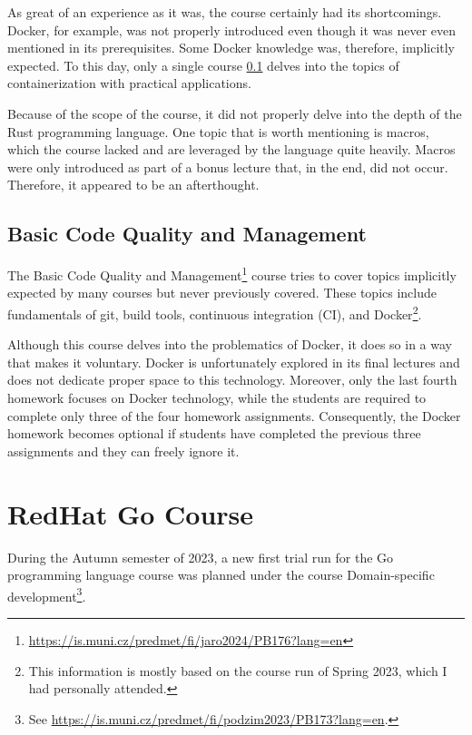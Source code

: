\documentclass[
  digital,
  color,
  oneside,
  nosansbold,
  nocolorbold,
  lof,
  lot,
]{fithesis4}
\begin{document}
As great of an experience as it was, the course certainly had its shortcomings. Docker, for example, was not properly introduced even though it was never even mentioned in its prerequisites. Some Docker knowledge was, therefore, implicitly expected. To this day, only a single course \cref{code-quality-and-management} delves into the topics of containerization with practical applications.

Because of the scope of the course, it did not properly delve into the depth of the Rust programming language. One topic that is worth mentioning is macros, which the course lacked and are leveraged by the language quite heavily. Macros were only introduced as part of a bonus lecture that, in the end, did not occur. Therefore, it appeared to be an afterthought.

\subsection{Basic Code Quality and Management}\label{code-quality-and-management}

The Basic Code Quality and Management\footnote{\url{https://is.muni.cz/predmet/fi/jaro2024/PB176?lang=en}} course tries to cover topics implicitly expected by many courses but never previously covered. These topics include fundamentals of git, build tools, continuous integration (CI), and Docker\footnote{This information is mostly based on the course run of Spring 2023, which I had personally attended.}. 

Although this course delves into the problematics of Docker, it does so in a way that makes it voluntary. Docker is unfortunately explored in its final lectures and does not dedicate proper space to this technology. Moreover, only the last fourth homework focuses on Docker technology, while the students are required to complete only three of the four homework assignments. Consequently, the Docker homework becomes optional if students have completed the previous three assignments and they can freely ignore it.

\section{RedHat Go Course}

During the Autumn semester of 2023, a new first trial run for the Go programming language course was planned under the course Domain-specific development\footnote{See \url{https://is.muni.cz/predmet/fi/podzim2023/PB173?lang=en}.}.
\end{document}
